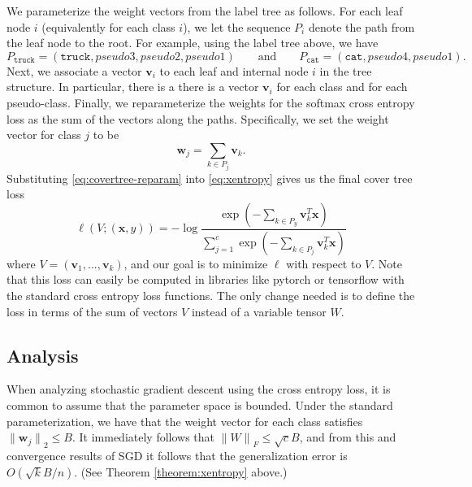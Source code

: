 \documentclass[10pt]{article}
\theoremstyle{definition}
\newcommand{\trans}[1]{{#1}^{T}}
\newcommand{\vv}{\mathbf v}
\newcommand{\w}{\mathbf w}
\newcommand{\x}{\mathbf x}
\newcommand{\ltwo}[1]{{\lVert {#1} \rVert}_2}
\newcommand{\lF}[1]{{\lVert {#1} \rVert}_F}
\begin{document}
We parameterize the weight vectors from the label tree as follows.
For each leaf node $i$ (equivalently for each class $i$),
we let the sequence $P_i$ denote the path from the leaf node to the root.
For example, using the label tree above,
we have
\begin{equation}
    P_{\texttt{truck}} = (\texttt{truck}, \textit{pseudo3}, \textit{pseudo2}, \textit{pseudo1} ) \qquad\text{and}\qquad
    P_{\texttt{cat}} = (\texttt{cat}, \textit{pseudo4}, \textit{pseudo1} )
    .
\end{equation}
Next, we associate a vector $\vv_i$ to each leaf and internal node $i$ in the tree structure.
In particular, there is a there is a vector $\vv_i$ for each class and for each pseudo-class.
Finally, we reparameterize the weights for the softmax cross entropy loss as the sum of the vectors along the paths.
Specifically, we set the weight vector for class $j$ to be 
\begin{equation}
    \label{eq:covertree-reparam}
    \w_j = \sum_{k\in P_j} \vv_k
    .
\end{equation}
Substituting \eqref{eq:covertree-reparam} into \eqref{eq:xentropy} gives us the final cover tree loss
\begin{equation}
    \ell(V;(\x,y)) = - \log \frac {\exp(-\sum_{k\in P_y}\trans\vv_k \x)}{\sum_{j=1}^c \exp(- \sum_{k\in P_j}\trans\vv_k \x)}
\end{equation}
where $V=(\vv_1,...,\vv_k)$,
and our goal is to minimize $\ell$ with respect to $V$.
Note that this loss can easily be computed in libraries like pytorch or tensorflow with the standard cross entropy loss functions.
The only change needed is to define the loss in terms of the sum of vectors $V$ instead of a variable tensor $W$.

\subsection{Analysis}

When analyzing stochastic gradient descent using the cross entropy loss,
it is common to assume that the parameter space is bounded.
Under the standard parameterization, we have that the weight vector for each class satisfies $\ltwo{\w_j} \le B$.
It immediately follows that $\lF{W} \le \sqrt{c}B$,
and from this and convergence results of SGD it follows that the generalization error is $O(\sqrt{k}B/n)$.
(See Theorem \ref{theorem:xentropy} above.)
\end{document}
